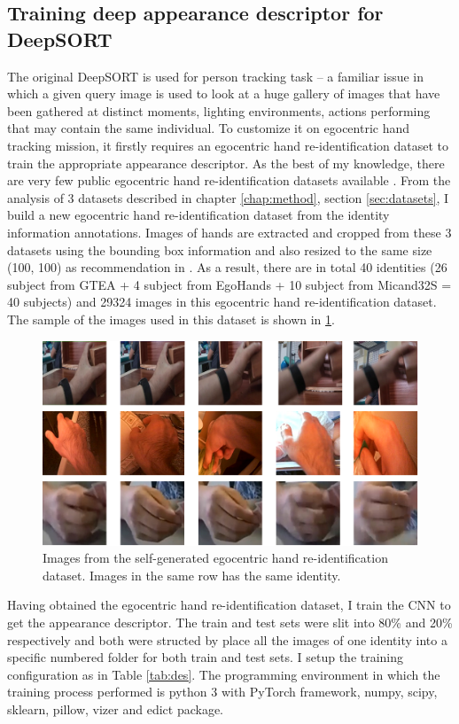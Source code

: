 \subsection{Training deep appearance descriptor for DeepSORT} \label{subsec:train_deep}
The original DeepSORT is used for person tracking task – a familiar issue in which a given query image is used to look at a huge gallery of images that have been gathered at distinct moments, lighting environments, actions performing that may contain the same individual. To customize it on egocentric hand tracking mission, it firstly requires an egocentric hand re-identification dataset to train the appropriate appearance descriptor. As the best of my knowledge, there are very few public egocentric hand re-identification datasets available \cite{9064606}. From the analysis of 3 datasets described in chapter \ref{chap:method}, section \ref{sec:datasets}, I build a new egocentric hand re-identification dataset from the identity information annotations. Images of hands are extracted and cropped from these 3 datasets using the bounding box information and also resized to the same size (100, 100) as recommendation in  \cite{DBLP:journals/corr/abs-1812-00442}. As a result, there are in total 40 identities (26 subject from GTEA + 4 subject from EgoHands + 10 subject from Micand32S = 40 subjects) and 29324 images in this egocentric hand re-identification dataset. The sample of the images used in this dataset is shown in \ref{fig:reid}.
\begin{figure}
	\centerline{\includegraphics[width=1\linewidth]{Figs/reid.png}}
	\caption{Images from the self-generated egocentric hand re-identification dataset. Images in the same row has the same identity.}
	\label{fig:reid}
\end{figure}
Having obtained the egocentric hand re-identification dataset, I train the CNN to get the appearance descriptor. The train and test sets were slit into 80\% and 20\% respectively and both were structed by place all the images of one identity into a specific numbered folder for both train and test sets. I setup the training configuration as in Table \ref{tab:des}. The programming environment in which the training process performed is python 3 with PyTorch framework, numpy, scipy, sklearn, pillow, vizer and edict package.

